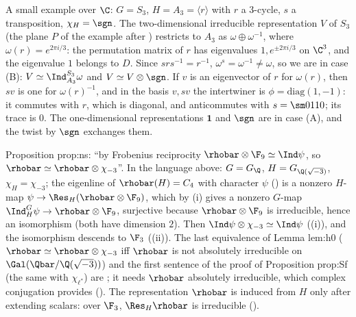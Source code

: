 A small example over $\C$: $G=S_3$, $H=A_3=\langle r\rangle$ with $r$ a $3$-cycle, $s$ a transposition, $\chi_H=\sgn$. The two-dimensional irreducible
representation $V$ of $S_3$ (the plane $P$ of the example after ) restricts to $A_3$ as $\omega\oplus\omega^{-1}$, where
$\omega(r)=e^{2\pi i/3}$: the permutation matrix of $r$ has eigenvalues $1,e^{\pm2\pi i/3}$ on $\C^3$, and the eigenvalue $1$ belongs to $D$. Since
$srs^{-1}=r^{-1}$, $\omega^s=\omega^{-1}\ne\omega$, so we are in case (B): $V\simeq\Ind_{A_3}^{S_3}\omega$ and $V\simeq V\otimes\sgn$. If $v$ is an eigenvector of $r$
for $\omega(r)$, then $sv$ is one for $\omega(r)^{-1}$, and in the basis $v,sv$ the intertwiner is $\phi=\mathrm{diag}(1,-1)$: it commutes with $r$, which is
diagonal, and anticommutes with $s=\sm0110$; its trace is $0$. The one-dimensional representations $\mathbf1$ and $\sgn$ are in case (A), and
the twist by $\sgn$ exchanges them.

\begin{paperlink}
Proposition prop:ns: ``by Frobenius reciprocity $\rhobar\otimes\F_9\simeq\Ind\psi$, so $\rhobar\simeq\rhobar\otimes\chi_{-3}$''. In the language above: $G=G_\Q$, $H=G_{\Q(\sqrt{-3})}$,
$\chi_H=\chi_{-3}$; the eigenline of $\rhobar(H)=C_4$ with character $\psi$ () is a nonzero $H$-map $\psi\to\Res_H(\rhobar\otimes\F_9)$, which
by (i) gives a nonzero $G$-map $\Ind_H^G\psi\to\rhobar\otimes\F_9$, surjective because $\rhobar\otimes\F_9$ is irreducible, hence
an isomorphism (both have dimension $2$). Then $\Ind\psi\otimes\chi_{-3}\simeq\Ind\psi$ ((i)), and the isomorphism
descends to $\F_3$ ((ii)). The last equivalence of Lemma lem:h0 ($\rhobar\simeq\rhobar\otimes\chi_{-3}$ iff $\rhobar$ is not absolutely
irreducible on $\Gal(\Qbar/\Q(\sqrt{-3}))$) and the first sentence of the proof of Proposition prop:Sf (the same with $\chi_{\ell^*}$) are
; it needs $\rhobar$ absolutely irreducible, which complex conjugation provides
(). The representation $\rhobar$ is induced from $H$ only after extending scalars: over $\F_3$, $\Res_H\rhobar$ is
irreducible ().
\end{paperlink}

